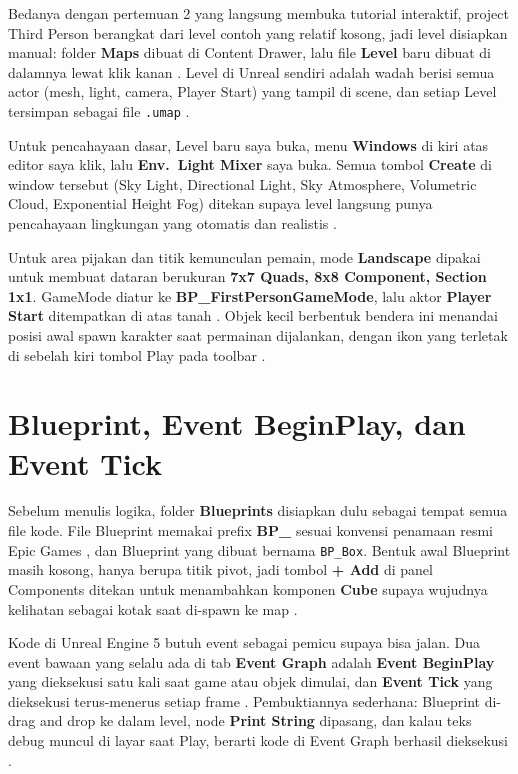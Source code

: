 \documentclass[a4paper,oneside,12pt]{report}
\begin{document}
Bedanya dengan pertemuan 2 yang langsung membuka tutorial interaktif, project Third Person berangkat dari level contoh yang relatif kosong, jadi level disiapkan manual: folder \textbf{Maps} dibuat di Content Drawer, lalu file \textbf{Level} baru dibuat di dalamnya lewat klik kanan \cite{modul3}. Level di Unreal sendiri adalah wadah berisi semua actor (mesh, light, camera, Player Start) yang tampil di scene, dan setiap Level tersimpan sebagai file \texttt{.umap} \cite{epic-levels}.

Untuk pencahayaan dasar, Level baru saya buka, menu \textbf{Windows} di kiri atas editor saya klik, lalu \textbf{Env.\ Light Mixer} saya buka. Semua tombol \textbf{Create} di window tersebut (Sky Light, Directional Light, Sky Atmosphere, Volumetric Cloud, Exponential Height Fog) ditekan supaya level langsung punya pencahayaan lingkungan yang otomatis dan realistis \cite{modul3}.

Untuk area pijakan dan titik kemunculan pemain, mode \textbf{Landscape} dipakai untuk membuat dataran berukuran \textbf{7x7 Quads, 8x8 Component, Section 1x1}. GameMode diatur ke \textbf{BP\_FirstPersonGameMode}, lalu aktor \textbf{Player Start} ditempatkan di atas tanah \cite{modul3}. Objek kecil berbentuk bendera ini menandai posisi awal spawn karakter saat permainan dijalankan, dengan ikon yang terletak di sebelah kiri tombol Play pada toolbar \cite{epic-place}.

\section{Blueprint, Event BeginPlay, dan Event Tick}
Sebelum menulis logika, folder \textbf{Blueprints} disiapkan dulu sebagai tempat semua file kode. File Blueprint memakai prefix \textbf{BP\_} sesuai konvensi penamaan resmi Epic Games \cite{epic-naming}, dan Blueprint yang dibuat bernama \texttt{BP\_Box}. Bentuk awal Blueprint masih kosong, hanya berupa titik pivot, jadi tombol \textbf{+ Add} di panel Components ditekan untuk menambahkan komponen \textbf{Cube} supaya wujudnya kelihatan sebagai kotak saat di-spawn ke map \cite{modul3}.

Kode di Unreal Engine 5 butuh event sebagai pemicu supaya bisa jalan. Dua event bawaan yang selalu ada di tab \textbf{Event Graph} adalah \textbf{Event BeginPlay} yang dieksekusi satu kali saat game atau objek dimulai, dan \textbf{Event Tick} yang dieksekusi terus-menerus setiap frame \cite{modul3}. Pembuktiannya sederhana: Blueprint di-drag and drop ke dalam level, node \textbf{Print String} dipasang, dan kalau teks debug muncul di layar saat Play, berarti kode di Event Graph berhasil dieksekusi \cite{modul3,epic-unreal}.
\end{document}

